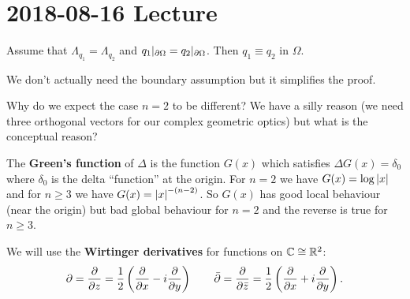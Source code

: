 \section{2018-08-16 Lecture}

\begin{thm}[$n=2$]
  Assume that $\Lambda_{q_1}=\Lambda_{q_2}$ and $q_1|_{\partial\Omega}=q_2|_{\partial\Omega}$.
  Then $q_1 \equiv q_2$ in $\Omega$.
\end{thm}

\begin{rmk}
  We don't actually need the boundary assumption but it simplifies the proof.
\end{rmk}

Why do we expect the case $n=2$ to be different?
We have a silly reason (we need three orthogonal vectors for our complex geometric optics) but what is the conceptual reason?

The \textbf{Green's function} of $\Delta$ is the function $G(x)$ which satisfies $\Delta G(x) = \delta_0$ where $\delta_0$ is the delta ``function'' at the origin.
For $n=2$ we have $G(x) = \log\left\lvert x \right\rvert$ and for $n \geq 3$ we have $G(x) = \left\lvert x \right\rvert^{-(n-2)}$.
So $G(x)$ has good local behaviour (near the origin) but bad global behaviour for $n=2$ and the reverse is true for $n \geq 3$.

\begin{defn}
  We will use the \textbf{Wirtinger derivatives} for functions on $\mathbb{C} \cong \mathbb{R}^2$:
  \[ \partial = \frac{\partial}{\partial z} = \frac 12 \left( \frac{\partial}{\partial x} - i \frac{\partial}{\partial y} \right) \qquad \bar{\partial}  = \frac{\partial}{\partial \bar z} = \frac 12 \left( \frac{\partial}{\partial x} + i\frac{\partial}{\partial y} \right). \]
\end{defn}

